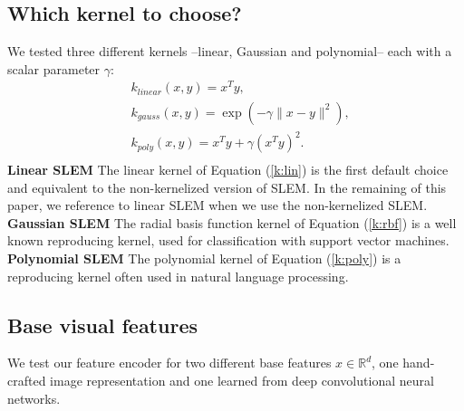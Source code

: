 \subsection{Which kernel to choose?}
We tested three different kernels --linear, Gaussian and polynomial-- each with a scalar parameter $\gamma$:
\begin{align}
    &k_{linear}(x,y) = x^Ty, \label{k:lin}\\
    &k_{gauss}(x,y) = \exp(-\gamma\|x-y \|^2), \label{k:rbf}\\
    &k_{poly}(x,y) = x^Ty+\gamma(x^Ty)^2. \label{k:poly}\\
\end{align}
\textbf{Linear SLEM} The linear kernel of Equation (\ref{k:lin}) is the first default choice and equivalent to the non-kernelized version of SLEM.
In the remaining of this paper, we reference to linear SLEM when we use the non-kernelized SLEM.
\textbf{Gaussian SLEM} The radial basis function kernel of Equation (\ref{k:rbf}) is a
well known reproducing kernel, used for classification with support vector machines.
\textbf{Polynomial SLEM} The polynomial kernel of Equation (\ref{k:poly}) is a reproducing kernel often used in natural language processing. 


\subsection{Base visual features}
We test our feature encoder for two different base features $x\in\mathbb{R}^d$, one hand-crafted image representation and one learned from deep convolutional neural networks.


